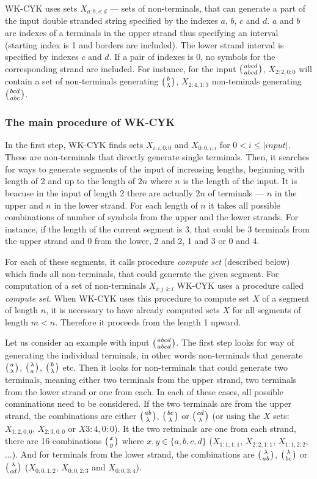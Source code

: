 WK-CYK uses sets $X_{a:b,c:d}$ --- sets of non-terminals, that can generate a part of the input double stranded string specified by the indexes $a$, $b$, $c$ and $d$. $a$ and $b$ are indexes of a terminals in the upper strand thus specifying an interval (starting index is 1 and borders are included). The lower strand interval is specified by indexes $c$ and $d$. If a pair of indexes is 0, no symbols for the corresponding strand are included. For instance, for the input $\wkpair{abcd}{abcd}$, $X_{2:2,0:0}$ will contain a set of non-terminals generating $\wkpair{b}{\lambda}$, $X_{2:4,1:3}$ non-teminals generating $\wkpair{bcd}{abc}$.

\subsubsection{The main procedure of WK-CYK}
In the first step, WK-CYK finds sets $X_{i:i,0:0}$ and $X_{0:0,i:i}$ for $0 < i \leq |input|$. These are non-terminals that directly generate single terminals. Then, it searches for ways to generate segments of the input of increasing lengths, beginning with length of 2 and up to the length of $2n$ where $n$ is the length of the input. It is beacuse in the input of length 2 there are actually $2n$ of terminals --- $n$ in the upper and $n$ in the lower strand. For each length of $n$ it takes all possible combinations of number of symbols from the upper and the lower strands. For instance, if the length of the current segment is 3, that could be 3 terminals from the upper strand and 0 from the lower, 2 and 2, 1 and 3 or 0 and 4.

For each of these segments, it calls procedure \textit{compute set} (described below) which finds all non-terminals, that could generate the given segment.
For computation of a set of non-terminals $X_{i:j,k:l}$ WK-CYK uses a procedure called \textit{compute set}. When WK-CYK uses this procedure to compute set $X$ of a segment of length $n$, it is necessary to have already computed sets $X$ for all segments of length $m < n$. Therefore it proceeds from the length 1 upward.

Let us consider an example with input $\wkpair{abcd}{abcd}$. The first step looks for way of generating the individual terminals, in other words non-terminals that generate $\wkpair{a}{\lambda}$, $\wkpair{\lambda}{a}$, $\wkpair{b}{\lambda}$ etc. Then it looks for non-terminals that could generate two terminals, meaning either two terminals from the upper strand, two terminals from the lower strand or one from each. In each of these cases, all possible comninations need to be considered. If the two terminals are from the upper strand, the combinations are either $\wkpair{ab}{\lambda}$, $\wkpair{bc}{\lambda}$ or $\wkpair{cd}{\lambda}$ (or using the $X$ sets: $X_{1:2,0:0}$, $X_{2:3,0:0}$ or $X{3:4,0:0}$). It the two retminals are one from each strand, there are 16 combinations $\wkpair{x}{y}$ where $x, y \in \{a, b, c, d\}$ ($X_{1:1,1:1}$, $X_{2:2,1:1}$, $X_{1:1,2:2}$, ...). And for terminals from the lower strand, the combinations are $\wkpair{\lambda}{ab}$, $\wkpair{\lambda}{bc}$ or $\wkpair{\lambda}{cd}$ ($X_{0:0,1:2}$, $X_{0:0,2:3}$ and $X_{0:0,3:4}$).

